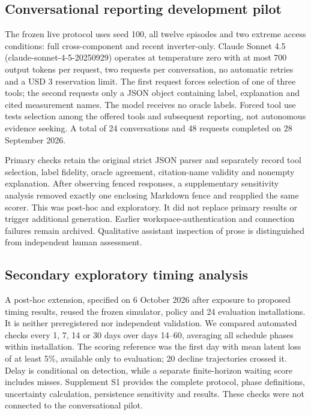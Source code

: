 \documentclass[11pt,a4paper]{article}
\begin{document}
\subsection{Conversational reporting development pilot}

The frozen live protocol uses seed 100, all twelve episodes and two extreme access conditions: full cross-component and recent inverter-only. Claude Sonnet 4.5 (claude-sonnet-4-5-20250929) operates at temperature zero with at most 700 output tokens per request, two requests per conversation, no automatic retries and a USD 3 reservation limit. The first request forces selection of one of three tools; the second requests only a JSON object containing label, explanation and cited measurement names. The model receives no oracle labels. Forced tool use tests selection among the offered tools and subsequent reporting, not autonomous evidence seeking. A total of 24 conversations and 48 requests completed on 28 September 2026.


Primary checks retain the original strict JSON parser and separately record tool selection, label fidelity, oracle agreement, citation-name validity and nonempty explanation. After observing fenced responses, a supplementary sensitivity analysis removed exactly one enclosing Markdown fence and reapplied the same scorer. This was post-hoc and exploratory. It did not replace primary results or trigger additional generation. Earlier workspace-authentication and connection failures remain archived. Qualitative assistant inspection of prose is distinguished from independent human assessment.


\subsection{Secondary exploratory timing analysis}

A post-hoc extension, specified on 6 October 2026 after exposure to proposed timing results, reused the frozen simulator, policy and 24 evaluation installations. It is neither preregistered nor independent validation. We compared automated checks every 1, 7, 14 or 30 days over days 14--60, averaging all schedule phases within installation. The scoring reference was the first day with mean latent loss of at least 5\%, available only to evaluation; 20 decline trajectories crossed it. Delay is conditional on detection, while a separate finite-horizon waiting score includes misses. Supplement S1 provides the complete protocol, phase definitions, uncertainty calculation, persistence sensitivity and results. These checks were not connected to the conversational pilot.
\end{document}
